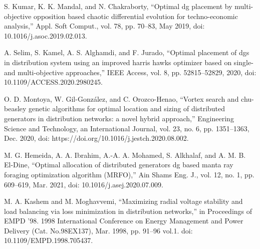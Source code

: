 \documentclass[conference]{IEEEtran}
\begin{document}
\begin{thebibliography}{00}
 S. Kumar, K. K. Mandal, and N. Chakraborty, “Optimal dg placement by multi-objective opposition based chaotic differential evolution for techno-economic analysis,” Appl. Soft Comput., vol. 78, pp. 70–83, May 2019, doi: 10.1016/j.asoc.2019.02.013.

 A. Selim, S. Kamel, A. S. Alghamdi, and F. Jurado, “Optimal placement of dgs in distribution system using an improved harris hawks optimizer based on single- and multi-objective approaches,” IEEE Access, vol. 8, pp. 52815–52829, 2020, doi: 10.1109/ACCESS.2020.2980245.

 O. D. Montoya, W. Gil-González, and C. Orozco-Henao, “Vortex search and chu-beasley genetic algorithms for optimal location and sizing of distributed generators in distribution networks: a novel hybrid approach,” Engineering Science and Technology, an International Journal, vol. 23, no. 6, pp. 1351–1363, Dec. 2020, doi: https://doi.org/10.1016/j.jestch.2020.08.002.

 M. G. Hemeida, A. A. Ibrahim, A.-A. A. Mohamed, S. Alkhalaf, and A. M. B. El-Dine, “Optimal allocation of distributed generators dg based manta ray foraging optimization algorithm (MRFO),” Ain Shams Eng. J., vol. 12, no. 1, pp. 609–619, Mar. 2021, doi: 10.1016/j.asej.2020.07.009.

 M. A. Kashem and M. Moghavvemi, “Maximizing radial voltage stability and load balancing via loss minimization in distribution networks,” in Proceedings of EMPD ’98. 1998 International Conference on Energy Management and Power Delivery (Cat. No.98EX137), Mar. 1998, pp. 91–96 vol.1. doi: 10.1109/EMPD.1998.705437.


\end{thebibliography}
\end{document}
